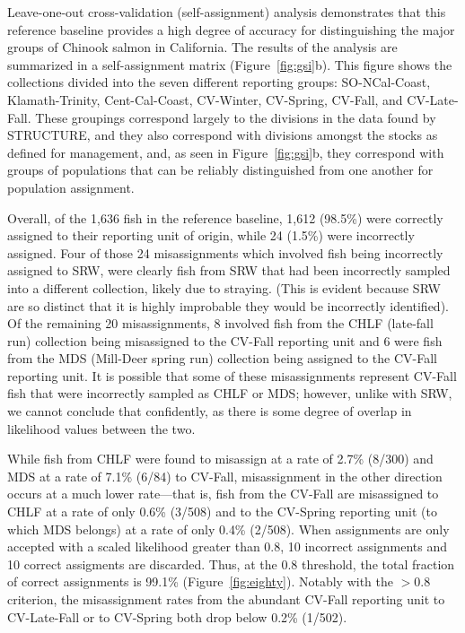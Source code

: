 Leave-one-out cross-validation (self-assignment) analysis demonstrates that this
reference baseline provides a high degree of accuracy for distinguishing the major
groups of Chinook salmon in California.  The results of the analysis are summarized
in a self-assignment matrix (Figure~\ref{fig:gsi}b).
This figure shows the collections divided into the seven different reporting groups:
SO-NCal-Coast,  Klamath-Trinity, Cent-Cal-Coast,
CV-Winter, CV-Spring, CV-Fall, and  CV-Late-Fall.  These groupings correspond
largely to the divisions in the data found by STRUCTURE, and they also correspond
with divisions amongst the stocks as defined for management, and, as seen in
Figure~\ref{fig:gsi}b, they correspond with groups of populations that can be reliably distinguished
from one another for population assignment.

Overall, of the 1,636 fish in the reference baseline, 1,612 (98.5\%) were correctly
assigned to their reporting unit of origin, while 24 (1.5\%) were incorrectly assigned.
Four of those 24 misassignments which involved fish being incorrectly assigned to
SRW, were clearly fish from SRW that had been incorrectly sampled into a different
collection, likely due to straying. (This is evident because SRW are so distinct that it is highly improbable they
would be incorrectly identified).  Of the remaining 20 misassignments,  8 involved fish from the
CHLF (late-fall run) collection being misassigned to the CV-Fall reporting unit and 6 were
fish from the MDS (Mill-Deer spring run) collection being assigned to the CV-Fall reporting unit.
It is possible that some of these misassignments represent CV-Fall fish that were incorrectly
sampled as CHLF or MDS; however, unlike with SRW,  we  cannot conclude that
confidently, as there is some degree of overlap in likelihood values between the two.

While fish from CHLF were found to misassign at a rate of 2.7\% (8/300) and MDS at a rate
of 7.1\% (6/84) to CV-Fall, misassignment in the other direction occurs at a much lower
rate---that is, fish from the CV-Fall are misassigned to CHLF at a rate
of only 0.6\% (3/508) and to the CV-Spring reporting unit (to which MDS belongs) at a rate
of only 0.4\% (2/508). When assignments are only accepted with a scaled likelihood greater than 0.8,
10 incorrect assignments and 10 correct assigments are discarded.  Thus,
at the 0.8 threshold, the total fraction of correct assignments is 99.1\% (Figure~\ref{fig:eighty}).
Notably with the $>$0.8 criterion, the misassignment rates from the abundant CV-Fall
reporting unit to CV-Late-Fall or to CV-Spring both drop below 0.2\% (1/502).  


